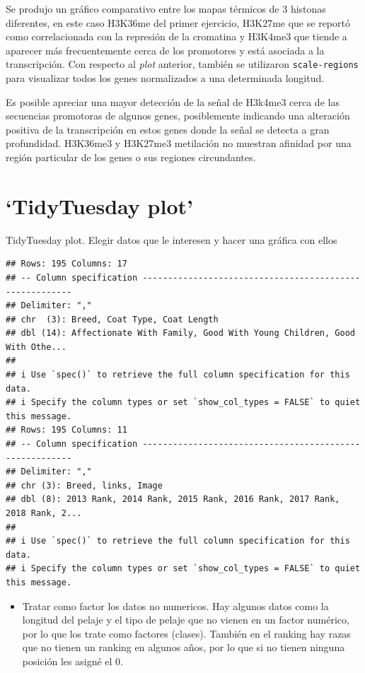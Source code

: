 \documentclass[
]{article}
\newcommand{\passthrough}[1]{#1}
\providecommand{\tightlist}{%
  \setlength{\itemsep}{0pt}\setlength{\parskip}{0pt}}
\begin{document}
Se produjo un gráfico comparativo entre los mapas térmicos de 3 histonas
diferentes, en este caso H3K36me del primer ejercicio, H3K27me que se
reportó como correlacionada con la represión de la cromatina y H3K4me3
que tiende a aparecer más frecuentemente cerca de los promotores y está
asociada a la transcripción. Con respecto al \emph{plot} anterior,
también se utilizaron \passthrough{\lstinline!scale-regions!} para
visualizar todos los genes normalizados a una determinada longitud.

Es posible apreciar una mayor detección de la señal de H3k4me3 cerca de
las secuencias promotoras de algunos genes, posiblemente indicando una
alteración positiva de la transcripción en estos genes donde la señal se
detecta a gran profundidad. H3K36me3 y H3K27me3 metilación no muestran
afinidad por una región particular de los genes o sus regiones
circundantes.

\hypertarget{tidytuesday-plot}{%
\section{`TidyTuesday plot'}\label{tidytuesday-plot}}

TidyTuesday plot. Elegir datos que le interesen y hacer una gráfica con
ellos

\begin{lstlisting}
## Rows: 195 Columns: 17
## -- Column specification --------------------------------------------------------
## Delimiter: ","
## chr  (3): Breed, Coat Type, Coat Length
## dbl (14): Affectionate With Family, Good With Young Children, Good With Othe...
## 
## i Use `spec()` to retrieve the full column specification for this data.
## i Specify the column types or set `show_col_types = FALSE` to quiet this message.
## Rows: 195 Columns: 11
## -- Column specification --------------------------------------------------------
## Delimiter: ","
## chr (3): Breed, links, Image
## dbl (8): 2013 Rank, 2014 Rank, 2015 Rank, 2016 Rank, 2017 Rank, 2018 Rank, 2...
## 
## i Use `spec()` to retrieve the full column specification for this data.
## i Specify the column types or set `show_col_types = FALSE` to quiet this message.
\end{lstlisting}

\begin{itemize}
\tightlist
\item
  Tratar como factor los datos no numericos. Hay algunos datos como la
  longitud del pelaje y el tipo de pelaje que no vienen en un factor
  numérico, por lo que los trate como factores (clases). También en el
  ranking hay razas que no tienen un ranking en algunos años, por lo que
  si no tienen ninguna posición les asigné el 0.
\end{itemize}
\end{document}

